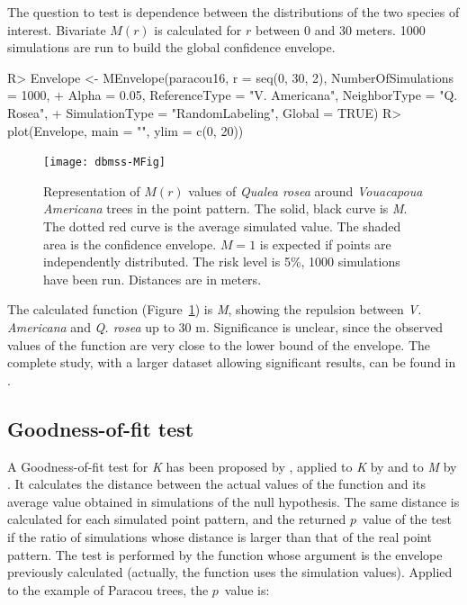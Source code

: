 \documentclass[nojss]{jss}
\begin{document}
The question to test is dependence between the distributions of the two species of interest.
Bivariate $M(r)$ is calculated for $r$ between 0 and 30 meters. 1000 simulations are run to build the global confidence envelope.

\begin{Schunk}
\begin{Sinput}
R> Envelope <- MEnvelope(paracou16, r = seq(0, 30, 2), NumberOfSimulations = 1000, 
+      Alpha = 0.05, ReferenceType = "V. Americana", NeighborType = "Q. Rosea", 
+      SimulationType = "RandomLabeling", Global = TRUE)
R> plot(Envelope, main = "", ylim = c(0, 20))
\end{Sinput}
\end{Schunk}

\begin{figure}
\centering
\texttt{[image: dbmss-MFig]}
\caption{Representation of $M(r)$ values of \emph{Qualea rosea} around \emph{Vouacapoua Americana} trees in the  point pattern. The solid, black curve is \emph{M}. The dotted red curve is the average simulated value. The shaded area is the confidence envelope. $M=1$ is expected if points are independently distributed. The risk level is 5\%, 1000 simulations have been run. Distances are in meters.}
\label{MQr}
\end{figure}

The calculated function (Figure~\ref{MQr}) is \emph{M}, showing the repulsion between \emph{V. Americana} and \emph{Q. rosea} up to 30 m. Significance is unclear, since the observed values of the function are very close to the lower bound of the envelope. The complete study, with a larger dataset allowing significant results, can be found in \cite{Marcon2012b}.

\subsection{Goodness-of-fit test}
A Goodness-of-fit test for \emph{K} has been proposed by \cite{Diggle1983}, applied to \emph{K} by \cite{Loosmore2006} and to \emph{M} by \cite{Marcon2012b}. It calculates the  distance between the actual values of the function and its average value obtained in simulations of the null hypothesis. The same distance is calculated for each simulated point pattern, and the returned $p$~value of the test if the ratio of simulations whose distance is larger than that of the real point pattern. The test is performed by the  function whose argument is the envelope previously calculated (actually, the function uses the simulation values). Applied to the example of Paracou trees, the $p$~value is:
\end{document}
